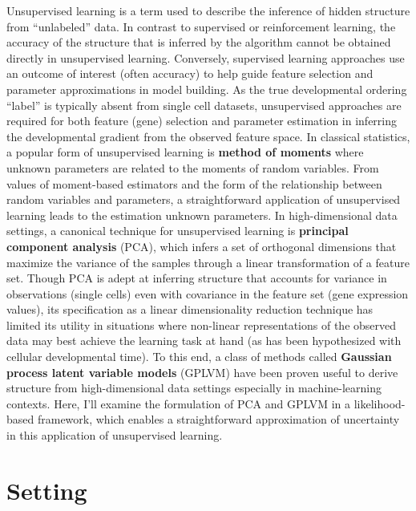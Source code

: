\documentclass[english, 11pt]{article}\usepackage[]{graphicx}\usepackage[]{color}
\begin{document}
Unsupervised learning is a term used to describe the inference of hidden structure from ``unlabeled'' data. \cite{hastie2009springer} In contrast to supervised or reinforcement learning, the accuracy of the structure that is inferred by the algorithm cannot be obtained directly in unsupervised learning. Conversely, supervised learning approaches use an outcome of interest (often accuracy) to help guide feature selection and parameter approximations in model building. As the true developmental ordering ``label'' is typically absent from single cell datasets, unsupervised approaches are required for both feature (gene) selection and parameter estimation in inferring the developmental gradient from the observed feature space. \newline \newline
In classical statistics, a popular form of unsupervised learning is \textbf{method of moments} where unknown parameters are related to the moments of random variables. \cite{hastie2009springer} From values of moment-based estimators and the form of the relationship between random variables and parameters, a straightforward application of unsupervised learning leads to the estimation unknown parameters. In high-dimensional data settings, a canonical technique for unsupervised learning is \textbf{principal component analysis} (PCA), which infers a set of orthogonal dimensions that maximize the variance of the samples through a linear transformation of a feature set. \cite{jolliffe2002principal} Though PCA is adept at inferring structure that accounts for variance in observations (single cells) even with covariance in the feature set (gene expression values), its specification as a linear dimensionality reduction technique has limited its utility in situations where non-linear representations of the observed data may best achieve the learning task at hand (as has been hypothesized with cellular developmental time). \cite{cannoodt2016computational} To this end, a class of methods called \textbf{Gaussian process latent variable models} (GPLVM) have been proven useful to derive structure from high-dimensional data settings especially in machine-learning contexts. \cite{lawrence2004gaussian} Here, I'll examine the formulation of PCA and GPLVM in a likelihood-based framework, which enables a straightforward approximation of uncertainty in this application of unsupervised learning. 


\section{Setting}
\end{document}
